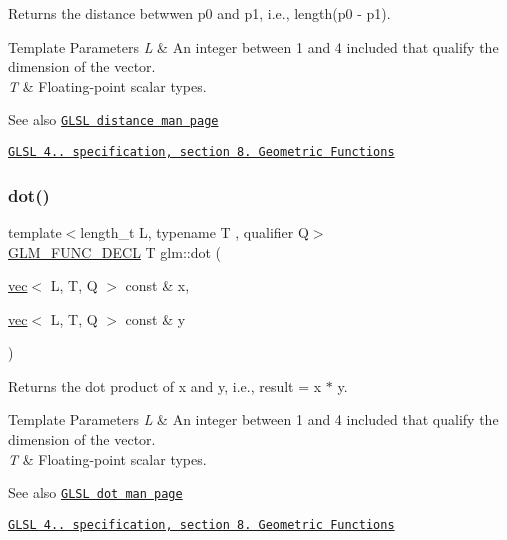 Returns the distance betwwen p0 and p1, i.\+e., length(p0 -\/ p1).


\begin{DoxyTemplParams}{Template Parameters}
{\em L} & An integer between 1 and 4 included that qualify the dimension of the vector. \\
\hline
{\em T} & Floating-\/point scalar types.\\
\hline
\end{DoxyTemplParams}
\begin{DoxySeeAlso}{See also}
\href{http://www.opengl.org/sdk/docs/manglsl/xhtml/distance.xml}{\tt G\+L\+SL distance man page} 

\href{http://www.opengl.org/registry/doc/GLSLangSpec.4.20.8.pdf}{\tt G\+L\+SL 4.. specification, section 8. Geometric Functions} 
\end{DoxySeeAlso}
\mbox{\label{group__core__func__geometric_gaad6c5d9d39bdc0bf43baf1b22e147a0a}} 
\subsubsection{\texorpdfstring{dot()}{dot()}}
{\footnotesize\ttfamily template$<$length\+\_\+t L, typename T , qualifier Q$>$ \\
\hyperlink{setup_8hpp_ab2d052de21a70539923e9bcbf6e83a51}{G\+L\+M\+\_\+\+F\+U\+N\+C\+\_\+\+D\+E\+CL} T glm\+::dot (\begin{DoxyParamCaption}\item[{\hyperlink{structglm_1_1vec}{vec}$<$ L, T, Q $>$ const \&}]{x,  }\item[{\hyperlink{structglm_1_1vec}{vec}$<$ L, T, Q $>$ const \&}]{y }\end{DoxyParamCaption})}

Returns the dot product of x and y, i.\+e., result = x $\ast$ y.


\begin{DoxyTemplParams}{Template Parameters}
{\em L} & An integer between 1 and 4 included that qualify the dimension of the vector. \\
\hline
{\em T} & Floating-\/point scalar types.\\
\hline
\end{DoxyTemplParams}
\begin{DoxySeeAlso}{See also}
\href{http://www.opengl.org/sdk/docs/manglsl/xhtml/dot.xml}{\tt G\+L\+SL dot man page} 

\href{http://www.opengl.org/registry/doc/GLSLangSpec.4.20.8.pdf}{\tt G\+L\+SL 4.. specification, section 8. Geometric Functions} 
\end{DoxySeeAlso}
\mbox{\label{group__core__func__geometric_ga7aed0a36c738169402404a3a5d54e43b}} 
